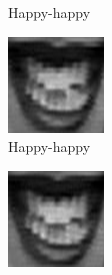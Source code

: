 \begin{figure}[H]
\begin{subfigure}[b]{0.15\textwidth}
		\caption{Happy-happy}
		\label{fig:timeseriesHappy:i}
	\end{subfigure}
	\begin{subfigure}[b]{0.15\textwidth}
		\includegraphics[width=\textwidth]{./img/timeseriesHappy/S026_006_00000010.png}
		\caption{Happy-happy}
		\label{fig:timeseriesHappy:j}
	\end{subfigure}
	\begin{subfigure}[b]{0.15\textwidth}
		\includegraphics[width=\textwidth]{./img/timeseriesHappy/S026_006_00000011.png}

\end{subfigure}
\end{figure}
